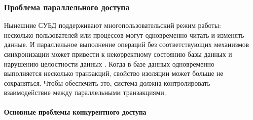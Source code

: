 \subsubsection{Проблема параллельного доступа}

Нынешние СУБД поддерживают многопользовательский режим работы: несколько пользователей или процессов могут одновременно читать и изменять данные. И параллельное выполнение операций без соответствующих механизмов синхронизации может привести к некорректному состоянию базы данных и нарушению целостности данных \autocite{ElmasriNavathe, Silberschatz}.
Когда в базе данных одновременно выполняется несколько транзакций, свойство изоляции может больше не сохраняться. Чтобы обеспечить это, система должна контролировать взаимодействие между параллельными транзакциями. \autocite{Silberschatz}

\paragraph{Основные проблемы конкурентного доступа} \label{par:concurrent_access_anomalies} ~\\

